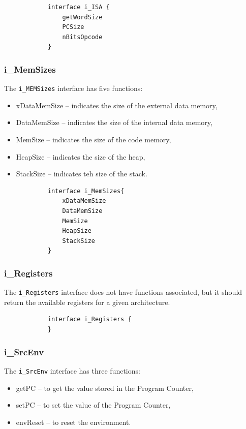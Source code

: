 \documentclass{report}
\begin{document}
			\begin{lstlisting}
			interface i_ISA {
				getWordSize	
				PCSize
				nBitsOpcode
			}
			\end{lstlisting} 
			
			\subsubsection*{i\_MemSizes}	
			
			\par The \texttt{i\_MEMSizes} interface has five functions:
			\begin{itemize}
				\item xDataMemSize -- indicates the size of the external data memory,
				\item DataMemSize -- indicates the size of the internal data memory,
				\item MemSize -- indicates the size of the code memory,
				\item HeapSize -- indicates the size of the heap,
				\item StackSize -- indicates teh size of the stack.
			\end{itemize}
			
			\begin{lstlisting}
			interface i_MemSizes{
				xDataMemSize 	
				DataMemSize 	
				MemSize			
				HeapSize			
				StackSize		
			}
			\end{lstlisting} 	

			\subsubsection*{i\_Registers}
			
			\par The \texttt{i\_Registers} interface does not have functions associated, but it should return the available registers for a given architecture.
			
			\begin{lstlisting}
			interface i_Registers {
			}
			\end{lstlisting}
			
			\subsubsection*{i\_SrcEnv}	
			
			\par The \texttt{i\_SrcEnv} interface has three functions:
			\begin{itemize}
				\item getPC -- to get the value stored in the Program Counter,
				\item setPC -- to set the value of the Program Counter,
				\item envReset -- to reset the environment.
			\end{itemize}
			
\end{document}
